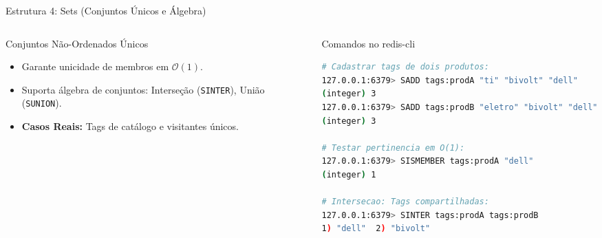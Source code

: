 \begin{frame}[fragile]{Estrutura 4: Sets (Conjuntos Únicos e Álgebra)}
  \begin{columns}[T]
    \begin{column}{0.48\textwidth}
      \alert{Conjuntos Não-Ordenados Únicos}\par
      \small
      \begin{itemize}
        \item Garante unicidade de membros em $\mathcal{O}(1)$.
        \item Suporta álgebra de conjuntos: Interseção (\texttt{SINTER}), União (\texttt{SUNION}).
        \item \textbf{Casos Reais:} Tags de catálogo e visitantes únicos.
      \end{itemize}
    \end{column}
    \begin{column}{0.50\textwidth}
      \alert{Comandos no redis-cli}\par
      \begin{lstlisting}[language=bash]
# Cadastrar tags de dois produtos:
127.0.0.1:6379> SADD tags:prodA "ti" "bivolt" "dell"
(integer) 3
127.0.0.1:6379> SADD tags:prodB "eletro" "bivolt" "dell"
(integer) 3

# Testar pertinencia em O(1):
127.0.0.1:6379> SISMEMBER tags:prodA "dell"
(integer) 1

# Intersecao: Tags compartilhadas:
127.0.0.1:6379> SINTER tags:prodA tags:prodB
1) "dell"  2) "bivolt"
      \end{lstlisting}
    \end{column}
  \end{columns}
\end{frame}

